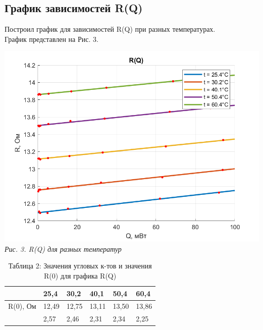 

\subsection{График зависимостей R(Q)}

Построил график для зависимостей R(Q) при разных температурах. \\График представлен на Рис. 3. \\

\begin{center}
    \includegraphics[scale = 1.3]{picks/223_R(Q).png} \\
    \textit{\textcolor[HTML]{000000}{Рис. 3. R(Q) для разных температур}}
\end{center}

\vspace{0.5cm}

    \begin{table}[h!]
    	\begin{center}
    		\caption*{\color[HTML]{000000}Таблица 2: Значения угловых к-тов  и значения R(0) для графика R(Q)}
    		\begin{tabular}{|P{3cm}|P{1.3cm}|P{1.3cm}|P{1.3cm}|P{1.3cm}|P{1.3cm}|}
    		\hline

                    		& 25,4  & 30,2  & 40,1  & 50,4  & 60,4 \\  
    		    \hline
    		    R(0), Ом                    & 12,49 & 12,75 & 13,11 & 13,50 & 13,86 \\
    		    \hline
                  & 2,57 & 2,46 & 2,31 & 2,34 & 2,25 \\


            \hline    		
    		\end{tabular}
    	\end{center}
    \end{table}

